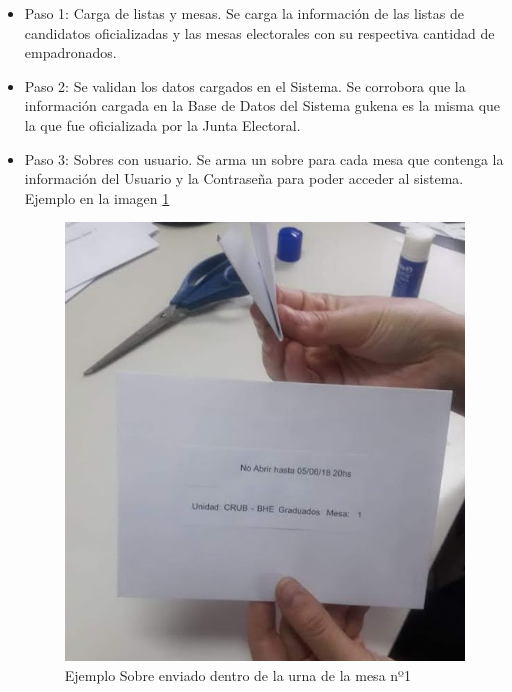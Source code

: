 \begin{itemize}

\item Paso 1: Carga de listas y mesas. Se carga la información de las listas de candidatos oficializadas y las mesas electorales con su respectiva cantidad de empadronados.
\item Paso 2: Se validan los datos cargados en el Sistema. Se corrobora que la información cargada en la Base de Datos del Sistema gukena es la misma que la que fue oficializada por la Junta Electoral.
\item Paso 3: Sobres con usuario. Se arma un sobre para cada mesa que contenga la información del Usuario y la Contraseña para poder acceder al sistema. Ejemplo en la imagen \ref{graf:ejemploSobre}

\begin{figure}[h!]
    \begin{center}
        \includegraphics[scale=0.5]{img/jKz6EB2F9Z.png}
    \end{center}
  \caption{Ejemplo Sobre enviado dentro de la urna de la mesa nº1}
  \label{graf:ejemploSobre}
\end{figure}


\end{itemize}
